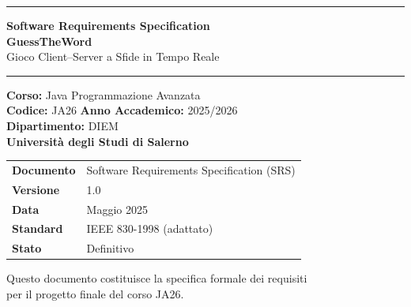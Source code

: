 \documentclass[12pt, a4paper]{article}
\begin{document}
\begin{titlepage}
    \centering
    \vspace*{1.5cm}

    {\color{primaryBlue}\rule{\linewidth}{1.5pt}}
    \vspace{0.5cm}

    {\Huge\bfseries\color{primaryBlue} Software Requirements Specification}\\[0.4cm]
    {\LARGE\bfseries GuessTheWord}\\[0.2cm]
    {\large Gioco Client–Server a Sfide in Tempo Reale}

    \vspace{0.5cm}
    {\color{primaryBlue}\rule{\linewidth}{1.5pt}}

    \vspace{1.5cm}

    \begin{tcolorbox}[colback=lightBlue, colframe=primaryBlue, width=0.85\linewidth]
        \centering
        \textbf{Corso:} Java Programmazione Avanzata\\[0.2cm]
        \textbf{Codice:} JA26 \quad
        \textbf{Anno Accademico:} 2025/2026\\[0.2cm]
        \textbf{Dipartimento:} DIEM\\
        \textbf{Università degli Studi di Salerno}
    \end{tcolorbox}

    \vspace{1.5cm}

    \begin{tabular}{ll}
        \toprule
        \textbf{Documento}      & Software Requirements Specification (SRS) \\
        \textbf{Versione}       & 1.0 \\
        \textbf{Data}           & Maggio 2025 \\
        \textbf{Standard}       & IEEE 830-1998 (adattato) \\
        \textbf{Stato}          & Definitivo \\
        \bottomrule
    \end{tabular}

    \vfill

    {\small\color{darkGray}
    Questo documento costituisce la specifica formale dei requisiti\\
    per il progetto finale del corso JA26.}
\end{titlepage}
\end{document}
